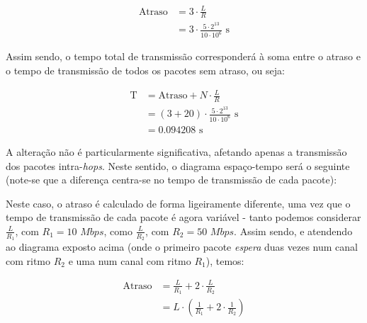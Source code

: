 \begin{enumerate}[leftmargin=\labelsep]
        $$
          \begin{aligned}
            \text{Atraso} & = 3 \cdot \frac{L}{R}                                    \\
                          & = 3 \cdot \frac{5 \cdot 2^{13}}{10 \cdot 10^6} \text{ s}
          \end{aligned}
        $$

        Assim sendo, o tempo total de transmissão corresponderá à soma entre o atraso
        e o tempo de transmissão de todos os pacotes sem atraso, ou seja:

        $$
          \begin{aligned}
            \text{T} & = \text{Atraso} + N \cdot \frac{L}{R}                           \\
                     & = (3 + 20) \cdot \frac{5 \cdot 2^{13}}{10 \cdot 10^6} \text{ s} \\
                     & = 0.094208 \text{ s}
          \end{aligned}
        $$


        A alteração não é particularmente significativa, afetando apenas a transmissão
        dos pacotes intra-\textit{hops}. Neste sentido, o diagrama espaço-tempo
        será o seguinte (note-se que a diferença centra-se no tempo de transmissão
        de cada pacote):

        \begin{figure}[H]
          \centering
          
        \end{figure}

        Neste caso, o atraso é calculado de forma ligeiramente diferente, uma vez
        que o tempo de transmissão de cada pacote é agora variável - tanto podemos
        considerar $\frac{L}{R_1}$, com $R_1 = 10$ $Mbps$, como $\frac{L}{R_2}$,
        com $R_2 = 50$ $Mbps$. Assim sendo, e atendendo ao diagrama exposto
        acima (onde o primeiro pacote \textit{espera} duas vezes num canal com
        ritmo $R_2$ e uma num canal com ritmo $R_1$), temos:

        $$
          \begin{aligned}
            \text{Atraso} & = \frac{L}{R_1} + 2 \cdot \frac{L}{R_2}                       \\
                          & = L \cdot \left( \frac{1}{R_1} + 2 \cdot \frac{1}{R_2}\right)
          \end{aligned}
        $$


\end{enumerate}
